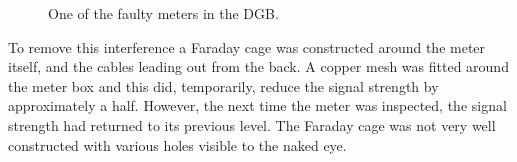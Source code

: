 \documentclass[a4paper,12pt]{article}
\begin{document}
\begin{figure}
\begin{center}
                                                                                                                                                                                                                                                                                                                                                                                                                                                                                                                                                                                                                            \end{center}
                                                                                                                                                                                                                                                                                                                                                                                                                                                                                                                                                                                                                                                          \caption{One of the faulty meters in the DGB. \label{fig:GeneratorMeter}}
                                                                                                                                                                                                                                                                                                                                                                                                                                                                                                                                                                                                                                                                                        \end{figure}
                                                                                                                                                                                                                                                                                                                                                                                                                                                                                                                                                                                                                                                                                                                      To remove this interference a Faraday cage was constructed around the meter itself, and the cables leading out from the back. A copper mesh was fitted around the meter box and this did, temporarily, reduce the signal strength by approximately a half. However, the next time the meter was inspected, the signal strength had returned to its previous level. The Faraday cage was not very well constructed with various holes visible to the naked eye. 
\end{document}
